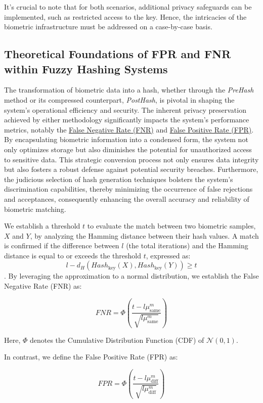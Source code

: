 It's crucial to note that for both scenarios, additional privacy safeguards can be implemented, such as restricted access to the key. Hence, the intricacies of the biometric infrastructure must be addressed on a case-by-case basis.

\subsection{Theoretical Foundations of FPR and FNR within Fuzzy Hashing Systems}

The transformation of biometric data into a hash, whether through the \textit{PreHash} method or its compressed counterpart, \textit{PostHash}, is pivotal in shaping the system's operational efficiency and security. The inherent privacy preservation achieved by either methodology significantly impacts the system's performance metrics, notably the \hyperref[def:FNR]{False Negative Rate (FNR)} and \hyperref[def:FPR]{False Positive Rate (FPR)}. By encapsulating biometric information into a condensed form, the system not only optimizes storage but also diminishes the potential for unauthorized access to sensitive data. This strategic conversion process not only ensures data integrity but also fosters a robust defense against potential security breaches. Furthermore, the judicious selection of hash generation techniques bolsters the system's discrimination capabilities, thereby minimizing the occurrence of false rejections and acceptances, consequently enhancing the overall accuracy and reliability of biometric matching.

We establish a threshold \(t\) to evaluate the match between two biometric samples, \(X\) and \(Y\), by analyzing the Hamming distance between their hash values. A match is confirmed if the difference between \(l\) (the total iterations) and the Hamming distance is equal to or exceeds the threshold \(t\), expressed as: \[l - d_H(Hash_{\text{key}}(X), Hash_{\text{key}}(Y)) \geq t\].
By leveraging the approximation to a normal distribution, we establish the False Negative Rate (FNR) as:

\[FNR = \Phi\left( \frac{t - l\mu_{\text{same}}^m}{\sqrt{l\mu_{\text{same}}^m}} \right)\]

Here, \(\Phi\) denotes the Cumulative Distribution Function (CDF) of \(\mathcal{N}(0, 1)\).

In contrast, we define the False Positive Rate (FPR) as:

\[FPR = \Phi\left( \frac{t - l\mu_{\text{diff}}^m}{\sqrt{l\mu_{\text{diff}}^m}} \right)\]

